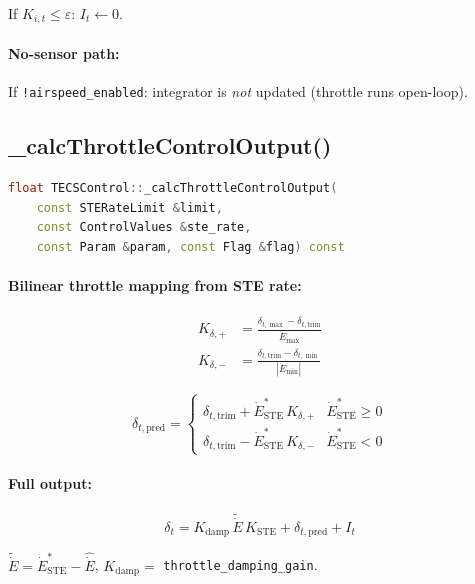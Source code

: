 \documentclass[12pt,a4paper]{article}
\begin{document}
If $K_{i,t} \leq \varepsilon$: $I_t \leftarrow 0$.

\paragraph{No-sensor path:} If \texttt{!airspeed\_enabled}: integrator
is \emph{not} updated (throttle runs open-loop).

\subsection{\_calcThrottleControlOutput()}

\begin{lstlisting}[language=C++]
float TECSControl::_calcThrottleControlOutput(
    const STERateLimit &limit,
    const ControlValues &ste_rate,
    const Param &param, const Flag &flag) const
\end{lstlisting}

\paragraph{Bilinear throttle mapping from STE rate:}
\begin{align}
  K_{\delta,+} &= \frac{\delta_{t,\max} - \delta_{t,\text{trim}}}{\dot{E}_{\max}} \\
  K_{\delta,-} &= \frac{\delta_{t,\text{trim}} - \delta_{t,\min}}{|\dot{E}_{\min}|}
\end{align}

\begin{equation}
  \delta_{t,\text{pred}} = \begin{cases}
    \delta_{t,\text{trim}} + \dot{E}^*_{\text{STE}}\,K_{\delta,+} & \dot{E}^*_{\text{STE}} \geq 0 \\
    \delta_{t,\text{trim}} - \dot{E}^*_{\text{STE}}\,K_{\delta,-} & \dot{E}^*_{\text{STE}} < 0
  \end{cases}
\end{equation}

\paragraph{Full output:}
\begin{equation}
  \delta_t = K_{\text{damp}}\,\tilde{\dot{E}}\,K_{\text{STE}}
           + \delta_{t,\text{pred}} + I_t
\end{equation}

$\tilde{\dot{E}} = \dot{E}^*_{\text{STE}} - \hat{\dot{E}}$,
$K_{\text{damp}} = $ \texttt{throttle\_damping\_gain}.
\end{document}
